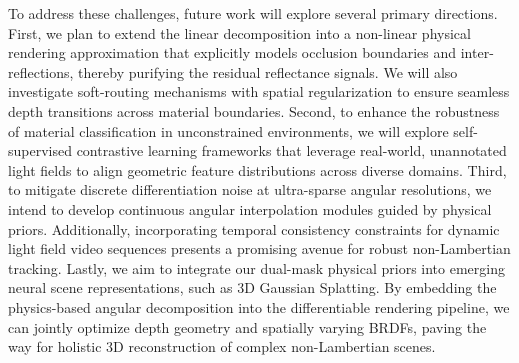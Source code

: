 To address these challenges, future work will explore several primary directions. First, we plan to extend the linear decomposition into a non-linear physical rendering approximation that explicitly models occlusion boundaries and inter-reflections, thereby purifying the residual reflectance signals. We will also investigate soft-routing mechanisms with spatial regularization to ensure seamless depth transitions across material boundaries. Second, to enhance the robustness of material classification in unconstrained environments, we will explore self-supervised contrastive learning frameworks that leverage real-world, unannotated light fields to align geometric feature distributions across diverse domains. Third, to mitigate discrete differentiation noise at ultra-sparse angular resolutions, we intend to develop continuous angular interpolation modules guided by physical priors. Additionally, incorporating temporal consistency constraints for dynamic light field video sequences presents a promising avenue for robust non-Lambertian tracking. Lastly, we aim to integrate our dual-mask physical priors into emerging neural scene representations, such as 3D Gaussian Splatting. By embedding the physics-based angular decomposition into the differentiable rendering pipeline, we can jointly optimize depth geometry and spatially varying BRDFs, paving the way for holistic 3D reconstruction of complex non-Lambertian scenes.